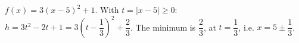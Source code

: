 $f(x)=3(x-5)^2+1$. With $t=|x-5|\ge0$: $h=3t^2-2t+1=3\left(t-\dfrac{1}{3}\right)^2+\dfrac{2}{3}$. The minimum is $\boxed{\dfrac{2}{3}}$, at $t=\dfrac{1}{3}$, i.e. $x=5\pm\dfrac{1}{3}$.

